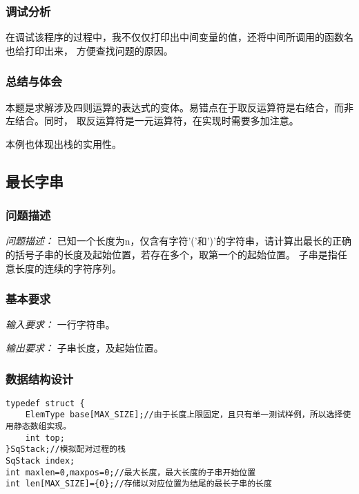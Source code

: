 \documentclass[a4paper,11pt]{article}%
\newenvironment{shadedquotation}
 {\begin{shaded*}
  \quoting[leftmargin=0pt, vskip=0pt]
 }
 {\endquoting
 \end{shaded*}
}
\begin{document}
\subsubsection{调试分析}
在调试该程序的过程中，我不仅仅打印出中间变量的值，还将中间所调用的函数名也给打印出来，
方便查找问题的原因。
\subsubsection{总结与体会}
本题是求解涉及四则运算的表达式的变体。易错点在于取反运算符是右结合，而非左结合。同时，
取反运算符是一元运算符，在实现时需要多加注意。

本例也体现出栈的实用性。
\subsection{最长字串}
\subsubsection{问题描述}
\begin{shadedquotation}
    \emph{问题描述：}
    已知一个长度为n，仅含有字符'('和')'的字符串，请计算出最长的正确的括号子串的长度及起始位置，若存在多个，取第一个的起始位置。
子串是指任意长度的连续的字符序列。
\end{shadedquotation}
\subsubsection{基本要求}
\begin{shadedquotation}
    \emph{输入要求：}
    一行字符串。
\end{shadedquotation}
\begin{shadedquotation}
    \emph{输出要求：}
    子串长度，及起始位置。
\end{shadedquotation}
\subsubsection{数据结构设计}
\begin{lstlisting}[language={[ANSI]C},keywordstyle=\color{blue!70},commentstyle=\color{red!50!green!50!blue!50},frame=shadowbox,
				rulesepcolor=\color{red!20!green!20!blue!20}]
typedef struct {
	ElemType base[MAX_SIZE];//由于长度上限固定，且只有单一测试样例，所以选择使用静态数组实现。
	int top;
}SqStack;//模拟配对过程的栈
SqStack index;
int maxlen=0,maxpos=0;//最大长度，最大长度的子串开始位置
int len[MAX_SIZE]={0};//存储以对应位置为结尾的最长子串的长度
\end{lstlisting}
\end{document}
